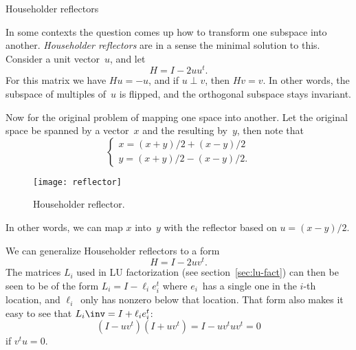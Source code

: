  {Householder reflectors}
\label{app:reflector}

In some contexts the question comes up how to transform one subspace into another.
\emph{Householder reflectors} are in a sense the minimal solution to this. Consider
a unit vector~$u$, and let \[ H= I-2uu^t. \]
For this matrix we have $Hu=-u$, and if $u\perp v$, then $Hv=v$.
In other words, the subspace of multiples of~$u$ is 
flipped, and the orthogonal subspace stays invariant.

Now for the original problem of mapping one space into another. Let the original space be spanned
by a vector~$x$ and the resulting by~$y$, then note that 
\[ 
\begin{cases}
x = (x+y)/2 + (x-y)/2\\ y = (x+y)/2 - (x-y)/2.
\end{cases}
\]
\begin{figure}[ht]
  \texttt{[image: reflector]}
  \caption{Householder reflector.}
  \label{fig:reflector}
\end{figure}
In other words, we can map $x$ into~$y$ with the reflector based on
$u=(x-y)/2$.

We can generalize Householder reflectors to a form \[ H=I-2uv^t. \]
The matrices $L_i$ used in LU factorization (see section~\ref{sec:lu-fact})
can then be seen to be of the form $L_i = I-\ell_ie_i^t$ where $e_i$~has a single one
in the $i$-th location, and $\ell_i$~only has nonzero below that location.
That form also makes it easy to see that $L_i\inv = I+\ell_ie_i^t$:
\[ (I-uv^t)(I+uv^t) = I-uv^tuv^t = 0 \]
if $v^tu=0$.



